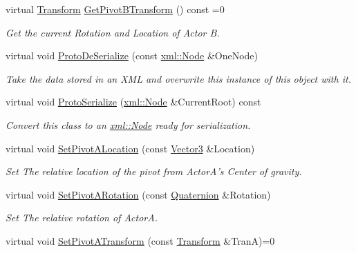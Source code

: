 \begin{DoxyCompactItemize}
virtual \hyperlink{classphys_1_1Transform}{Transform} \hyperlink{classphys_1_1DualTransformConstraint_a7ef9820bbfa2f0d70019743e16cb2618}{GetPivotBTransform} () const =0
\begin{DoxyCompactList}\small\item\em Get the current Rotation and Location of Actor B. \item\end{DoxyCompactList}\item 
virtual void \hyperlink{classphys_1_1DualTransformConstraint_a72bb3a5f35dffc4b6b9b860eb232b7a3}{ProtoDeSerialize} (const \hyperlink{classphys_1_1xml_1_1Node}{xml::Node} \&OneNode)
\begin{DoxyCompactList}\small\item\em Take the data stored in an XML and overwrite this instance of this object with it. \item\end{DoxyCompactList}\item 
virtual void \hyperlink{classphys_1_1DualTransformConstraint_aa1e3919874eceedb6ba708af4d540b9b}{ProtoSerialize} (\hyperlink{classphys_1_1xml_1_1Node}{xml::Node} \&CurrentRoot) const 
\begin{DoxyCompactList}\small\item\em Convert this class to an \hyperlink{classphys_1_1xml_1_1Node}{xml::Node} ready for serialization. \item\end{DoxyCompactList}\item 
virtual void \hyperlink{classphys_1_1DualTransformConstraint_a0e074a05eeb464ebda332ac2f09c9412}{SetPivotALocation} (const \hyperlink{classphys_1_1Vector3}{Vector3} \&Location)
\begin{DoxyCompactList}\small\item\em Set The relative location of the pivot from ActorA's Center of gravity. \item\end{DoxyCompactList}\item 
virtual void \hyperlink{classphys_1_1DualTransformConstraint_ab602e9a72e490dcb34bb6ad2042a2341}{SetPivotARotation} (const \hyperlink{classphys_1_1Quaternion}{Quaternion} \&Rotation)
\begin{DoxyCompactList}\small\item\em Set The relative rotation of ActorA. \item\end{DoxyCompactList}\item 
virtual void \hyperlink{classphys_1_1DualTransformConstraint_af2ff2bca0d94f113ef47a8dfddeadb3a}{SetPivotATransform} (const \hyperlink{classphys_1_1Transform}{Transform} \&TranA)=0

\end{DoxyCompactItemize}
